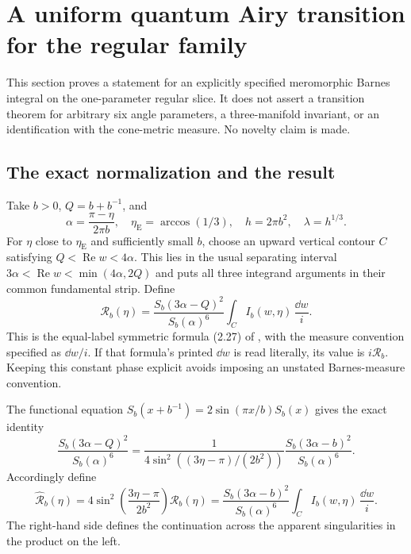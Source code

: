 \section{A uniform quantum Airy transition for the regular family}
\label{sec:quantumAiry}

This section proves a statement for an explicitly specified
meromorphic Barnes integral on the one-parameter regular slice.
It does not assert a transition theorem for arbitrary six angle
parameters, a three-manifold invariant, or an identification with
the cone-metric measure. No novelty claim is made.

\subsection{The exact normalization and the result}

Take $b>0$, $Q=b+b^{-1}$, and
\[
 \alpha=\frac{\pi-\eta}{2\pi b},\quad
 \eta_{\mathrm E}=\arccos(1/3),\quad
 h=2\pi b^2,\quad \lambda=h^{1/3}.
\]
For $\eta$ close to $\eta_{\mathrm E}$ and sufficiently small $b$,
choose an upward vertical contour $C$ satisfying
$Q<\operatorname{Re}w<4\alpha$. This lies in the usual separating
interval $3\alpha<\operatorname{Re}w<\min(4\alpha,2Q)$ and puts
all three integrand arguments in their common fundamental strip.
Define
\begin{equation}
 \mathcal R_b(\eta)=
 \frac{S_b(3\alpha-Q)^2}{S_b(\alpha)^6}
 \int_C I_b(w,\eta)\,\frac{\dd w}{i}.
 \label{eq:realregularsymbol}
\end{equation}
This is the equal-label symmetric formula (2.27) of
\cite{TeschnerVartanov}, with the measure convention specified as
$\dd w/i$. If that formula's printed $\dd w$ is read literally,
its value is $i\mathcal R_b$. Keeping this constant phase explicit
avoids imposing an unstated Barnes-measure convention.

The functional equation $S_b(x+b^{-1})=2\sin(\pi x/b)S_b(x)$
gives the exact identity
\begin{equation}
 \frac{S_b(3\alpha-Q)^2}{S_b(\alpha)^6}
 =
 \frac{1}{4\sin^2((3\eta-\pi)/(2b^2))}
 \frac{S_b(3\alpha-b)^2}{S_b(\alpha)^6}.
 \label{eq:externalpoleclearing}
\end{equation}
Accordingly define
\begin{equation}
 \widehat{\mathcal R}_b(\eta)
 =
 4\sin^2\!\left(\frac{3\eta-\pi}{2b^2}\right)\mathcal R_b(\eta)
 =
 \frac{S_b(3\alpha-b)^2}{S_b(\alpha)^6}
 \int_C I_b(w,\eta)\,\frac{\dd w}{i}.
 \label{eq:clearedregularsymbol}
\end{equation}
The right-hand side defines the continuation across the apparent
singularities in the product on the left.

